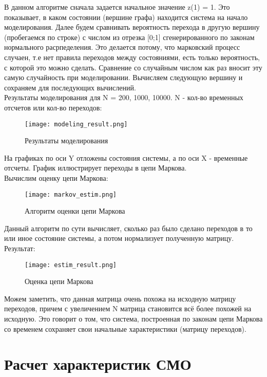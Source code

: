 В данном алгоритме сначала задается начальное значение z(1) = 1. Это показывает, в каком состоянии (вершине графа) находится
система на начало моделирования. Далее будем сравнивать вероятность перехода в другую вершину (пробегаемся по строке) с 
числом из отрезка [0;1] сгенерированного по законам нормального расрпеделения. Это делается потому, что марковский процесс
случаен, т.е нет правила переходов между состояниями, есть только вероятность, с которой это можно сделать. Сравнение со 
случайным числом как раз вносит эту самую случайность при моделировании. Вычисляем следующую вершину и сохраняем для последующих
вычислений.\\

Результаты моделирования для N = 200, 1000, 10000. N - кол-во временных отсчетов или кол-во переходов:

\begin{figure}[H]
    \centering
    \texttt{[image: modeling\_result.png]}
    \caption{Результаты моделирования}
\end{figure}

На графиках по оси Y отложены состояния системы, а по оси X - временные отсчеты. График иллюстрирует переходы в цепи Маркова. \\

Вычислим оценку цепи Маркова:

\begin{figure}[H]
    \centering
    \texttt{[image: markov\_estim.png]}
    \caption{Алгоритм оценки цепи Маркова}
\end{figure}

Данный алгоритм по сути вычисляет, сколько раз было сделано переходов в то или иное состояние системы, а потом нормализует
полученную матрицу. \\

Результат:

\begin{figure}[H]
    \centering
    \texttt{[image: estim\_result.png]}
    \caption{Оценка цепи Маркова}
\end{figure}

Можем заметить, что данная матрица очень похожа на исходную матрицу переходов, причем с увеличением N матрица становится всё более
похожей на исходную. Это говорит о том, что система, построенная по законам цепи Маркова со временем сохраняет свои начальные 
характеристики (матрицу переходов).

\section*{\textbf{Расчет характеристик СМО}}

